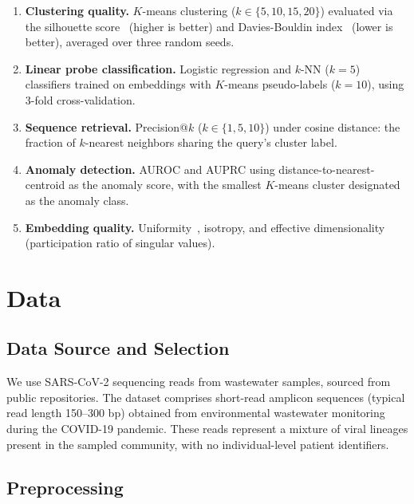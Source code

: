 \documentclass[pmlr]{jmlr}%
\begin{document}
\begin{enumerate}
    \item \textbf{Clustering quality.} $K$-means clustering ($k \in \{5, 10, 15, 20\}$) evaluated via the silhouette score~\citep{rousseeuw1987silhouettes} (higher is better) and Davies-Bouldin index~\citep{davies1979cluster} (lower is better), averaged over three random seeds.

    \item \textbf{Linear probe classification.} Logistic regression and $k$-NN ($k{=}5$) classifiers trained on embeddings with $K$-means pseudo-labels ($k{=}10$), using 3-fold cross-validation.

    \item \textbf{Sequence retrieval.} Precision@$k$ ($k \in \{1, 5, 10\}$) under cosine distance: the fraction of $k$-nearest neighbors sharing the query's cluster label.

    \item \textbf{Anomaly detection.} AUROC and AUPRC using distance-to-nearest-centroid as the anomaly score, with the smallest $K$-means cluster designated as the anomaly class.

    \item \textbf{Embedding quality.} Uniformity~\citep{wang2020understanding}, isotropy, and effective dimensionality (participation ratio of singular values).
\end{enumerate}

\section{Data}
\label{sec:data}

\subsection{Data Source and Selection}

We use SARS-CoV-2 sequencing reads from wastewater samples, sourced from public repositories. The dataset comprises short-read amplicon sequences (typical read length 150--300 bp) obtained from environmental wastewater monitoring during the COVID-19 pandemic. These reads represent a mixture of viral lineages present in the sampled community, with no individual-level patient identifiers.

\subsection{Preprocessing}
\end{document}
